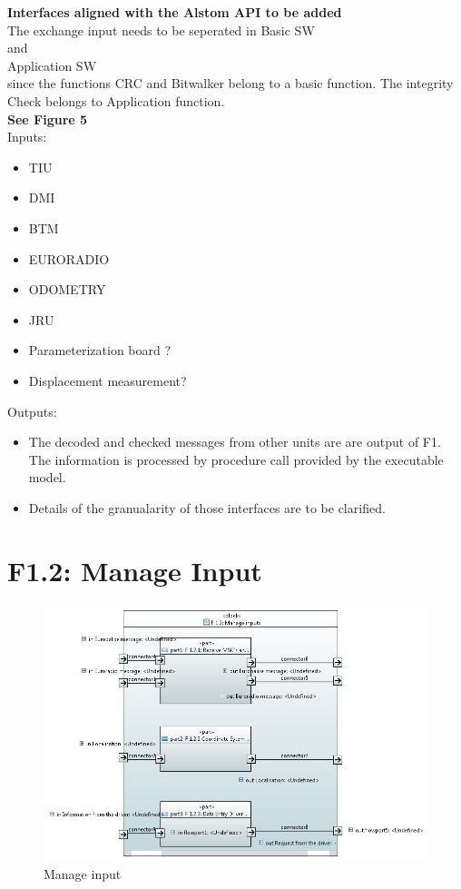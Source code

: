 \documentclass{template/openetcs_report}
\begin{document}
\textbf{Interfaces aligned with the Alstom API to be added}\\
The exchange input needs to be seperated in 
Basic SW\\
and\\
Application SW \\
since the functions CRC and Bitwalker belong to a basic function. The integrity Check belongs to Application function.\\

\textbf{See Figure 5}\\
 
Inputs:\\
\begin{itemize}
\item TIU
\item DMI
\item BTM
\item EURORADIO
\item ODOMETRY
\item JRU
\item Parameterization board ?
\item Displacement measurement?
\end{itemize}

Outputs:\\
\begin{itemize}
\item The decoded and checked messages from other units are  are output of F1. The information is processed by procedure call provided by the executable model.
\item Details of the granualarity of those interfaces are to be clarified.
\end{itemize}

\section{F1.2: Manage Input}
\begin{figure}[hbtp]
\centering
\includegraphics [scale=0.9] {images/Manage_inputs}
\caption{Manage input}
\end{figure}
\end{document}
